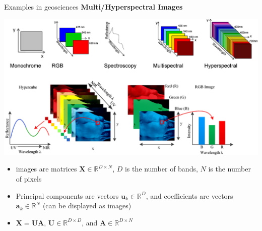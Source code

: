 \documentclass{beamer}
\begin{document}
\begin{frame}{Examples in geosciences}
\textbf{Multi/Hyperspectral Images}

\begin{center}
\includegraphics[scale = 0.25]{hyperspectral.png}
\end{center}

\begin{itemize}
\item images are matrices $\mathbf{X}\in\mathbb{R}^{D\times N}$, $D$ is the number of bands, $N$ is the number of pixels
\item Principal components are vectors $\mathbf{u}_{k} \in  \mathbb{R}^{D}$, and coefficients are vectors $\boldsymbol{a}_{k} \in \mathbb{R}^{N}$ (can be displayed as images)
\item $\mathbf{X} = \mathbf{U}\mathbf{A}$,  $\mathbf{U} \in \mathbb{R}^{D\times D}$, and $\mathbf{A} \in \mathbb{R}^{D\times N}$ 
\end{itemize}

\end{frame}
\end{document}

